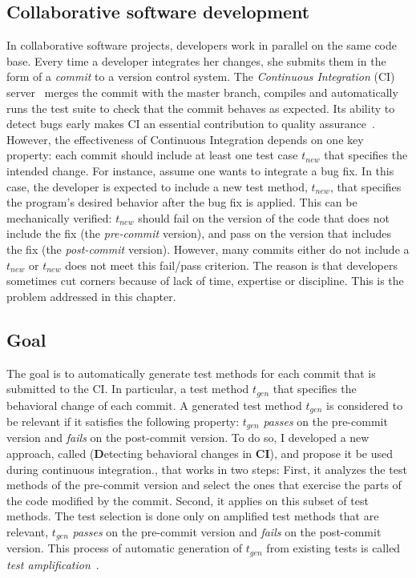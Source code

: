 \subsection{Collaborative software development} 
\label{subsec:dci:introduction:collaborative-software-development}
In collaborative software projects, developers work in parallel on the same code base. 
Every time a developer integrates her changes, she submits them in the form of a \emph{commit} to a version control system.
The \emph{Continuous Integration} (CI) server~\cite{fowler2006continuous} merges the commit with the master branch, compiles and automatically runs the test suite to check that the commit behaves as expected.
Its ability to detect bugs early makes CI an essential contribution to quality assurance~\cite{Hilton:2016:UsageCI,duvall2007continuous}.
However, the effectiveness of Continuous Integration depends on one key property: each commit should include at least one test case $t_{new}$ that specifies the intended change.
For instance, assume one wants to integrate a bug fix.
In this case, the developer is expected to include a new test method, $t_{new}$, that specifies the program's desired behavior after the bug fix is applied.
This can be mechanically verified: $t_{new}$ should fail on the version of the code that does not include the fix (the \emph{pre-commit} version), and pass on the version that includes the fix (the \emph{post-commit} version).
However, many commits either do not include a $t_{new}$ or $t_{new}$ does not meet this fail/pass criterion.
The reason is that developers sometimes cut corners because of lack of time, expertise or discipline. 
This is the problem addressed in this chapter.

\subsection{Goal}
\label{subsec:dci:introduction:goal}

The goal is to automatically generate test methods for each commit that is submitted to the CI.
In particular, a test method $t_{gen}$ that specifies the behavioral change of each commit.
A generated test method $t_{gen}$ is considered to be relevant if it satisfies the following property: 
$t_{gen}$ \textit{passes} on the pre-commit version and \textit{fails} on the post-commit version.
To do so, I developed a new approach, called \DCI (\textbf{D}etecting behavioral changes in \textbf{CI}), and propose it be used during continuous integration., that works in two steps:
First, it analyzes the test methods of the pre-commit version and select the ones that exercise the parts of the code modified by the commit.
Second, it applies \dspot on this subset of test methods.
The test selection is done only on amplified test methods that are relevant, \ie $t_{gen}$ \textit{passes} on the pre-commit version and \textit{fails} on the post-commit version.
This process of automatic generation of $t_{gen}$ from existing tests is called \emph{test amplification}~\cite{zhang2012}.

